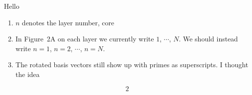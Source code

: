 \documentclass[10pt,times]{article}
\begin{document}
Hello


\begin{enumerate}
    \item $n$ denotes the layer number, core
    \item In Figure~2A on each layer we currently write  $1$, $\cdots$, $N$. We should instead write $n=1$, $n=2$,  $\cdots$, $n=N$. 
    \item The rotated basis vectors still show up with primes as superscripts. I thought the idea  
\end{enumerate}

\begin{equation}
2    
\end{equation}
\end{document}
